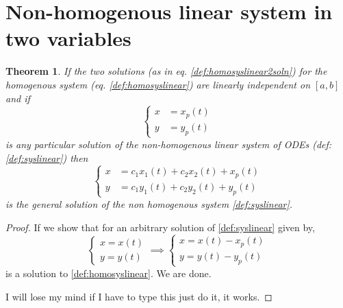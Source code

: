 \documentclass[oneside,11pt,pdftex,final]{book}%
\numberwithin{equation}{section}
\newtheorem{theorem}{Theorem}[chapter]%
\newtheorem{example}[theorem]{Example}
\numberwithin{section}{chapter}
\numberwithin{equation}{chapter}
\begin{document}
\section{Non-homogenous linear system in two variables}
\begin{theorem}
	If the two solutions (as in eq. \ref{def:homosyslinear2soln}) for the homogenous system (eq. \ref{def:homosyslinear}) are linearly independent on $ [a,b] $ and if 
	\[ \begin{cases}
		x&=x_p(t)\\
		y&=y_p(t)
	\end{cases} \]
	is any particular solution of the non-homogenous linear system of ODEs (def: \ref{def:syslinear}) then 
	\[ \begin{cases}
		x&=c_1x_1(t)+c_2x_2(t)+x_p(t)\\
		y&=c_1y_1(t)+c_2y_2(t)+y_p(t)
	\end{cases} \]
is the general solution of the non homogenous system \ref{def:syslinear}.
\end{theorem}
\begin{proof}
	If we show that for an arbitrary solution of \ref{def:syslinear} given by,
	\[ \begin{cases}
		x=x(t)\\
		y=y(t)
	\end{cases} \implies \begin{cases}
	x=x(t)-x_p(t)\\
	y=y(t)-y_p(t)
\end{cases} \]
	is a solution to \ref{def:homosyslinear}. We are done.
	
	I will lose my mind if I have to type this just do it, it works.
\end{proof}
\end{document}
